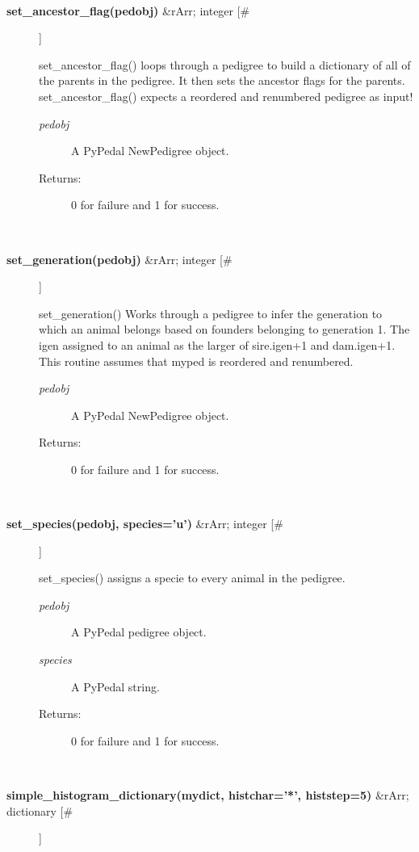 \documentclass[10pt]{article}
\begin{document}
\begin{description}
\begin{description}
\end{description}
\\ 

\item[\textbf{set\_ancestor\_flag(pedobj)}
 \&rArr; integer [\#]]

 set\_ancestor\_flag() loops through a pedigree to build a dictionary of all of the parents in the pedigree. It then sets the ancestor flags for the parents. set\_ancestor\_flag() expects a reordered and renumbered pedigree as input!
\begin{description}
\item[\emph{pedobj}
] A PyPedal NewPedigree object.
\item[Returns:] 0 for failure and 1 for success.

\end{description}
\\ 

\item[\textbf{set\_generation(pedobj)}
 \&rArr; integer [\#]]

 set\_generation() Works through a pedigree to infer the generation to which an animal belongs based on founders belonging to generation 1. The igen assigned to an animal as the larger of sire.igen+1 and dam.igen+1. This routine assumes that myped is reordered and renumbered.
\begin{description}
\item[\emph{pedobj}
] A PyPedal NewPedigree object.
\item[Returns:] 0 for failure and 1 for success.

\end{description}
\\ 

\item[\textbf{set\_species(pedobj, species='u')}
 \&rArr; integer [\#]]

 set\_species() assigns a specie to every animal in the pedigree.
\begin{description}
\item[\emph{pedobj}
] A PyPedal pedigree object.
\item[\emph{species}
] A PyPedal string.
\item[Returns:] 0 for failure and 1 for success.

\end{description}
\\ 

\item[\textbf{simple\_histogram\_dictionary(mydict, histchar='*', histstep=5)}
 \&rArr; dictionary [\#]]


\end{description}
\end{document}
